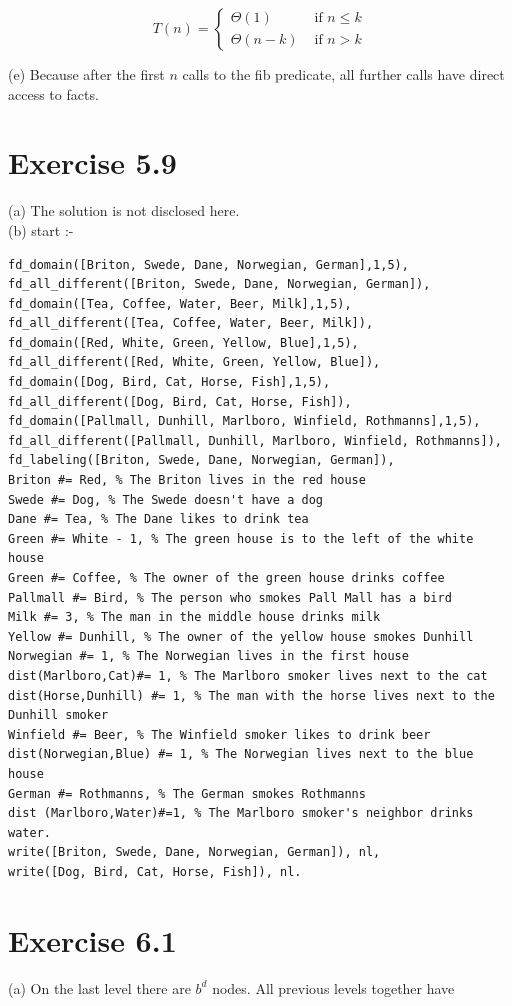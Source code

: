 \documentclass[10pt]{book}
\begin{document}
$$
T(n)= \begin{cases}\Theta(1) & \text { if } n \leq k \\ \Theta(n-k) & \text { if } n>k\end{cases}
$$

(e) Because after the first $n$ calls to the fib predicate, all further calls have direct access to facts.

\section{Exercise 5.9}
(a) The solution is not disclosed here.\\
(b) start :-

\begin{verbatim}
fd_domain([Briton, Swede, Dane, Norwegian, German],1,5),
fd_all_different([Briton, Swede, Dane, Norwegian, German]),
fd_domain([Tea, Coffee, Water, Beer, Milk],1,5),
fd_all_different([Tea, Coffee, Water, Beer, Milk]),
fd_domain([Red, White, Green, Yellow, Blue],1,5),
fd_all_different([Red, White, Green, Yellow, Blue]),
fd_domain([Dog, Bird, Cat, Horse, Fish],1,5),
fd_all_different([Dog, Bird, Cat, Horse, Fish]),
fd_domain([Pallmall, Dunhill, Marlboro, Winfield, Rothmanns],1,5),
fd_all_different([Pallmall, Dunhill, Marlboro, Winfield, Rothmanns]),
fd_labeling([Briton, Swede, Dane, Norwegian, German]),
Briton #= Red, % The Briton lives in the red house
Swede #= Dog, % The Swede doesn't have a dog
Dane #= Tea, % The Dane likes to drink tea
Green #= White - 1, % The green house is to the left of the white house
Green #= Coffee, % The owner of the green house drinks coffee
Pallmall #= Bird, % The person who smokes Pall Mall has a bird
Milk #= 3, % The man in the middle house drinks milk
Yellow #= Dunhill, % The owner of the yellow house smokes Dunhill
Norwegian #= 1, % The Norwegian lives in the first house
dist(Marlboro,Cat)#= 1, % The Marlboro smoker lives next to the cat
dist(Horse,Dunhill) #= 1, % The man with the horse lives next to the Dunhill smoker
Winfield #= Beer, % The Winfield smoker likes to drink beer
dist(Norwegian,Blue) #= 1, % The Norwegian lives next to the blue house
German #= Rothmanns, % The German smokes Rothmanns
dist (Marlboro,Water)#=1, % The Marlboro smoker's neighbor drinks water.
write([Briton, Swede, Dane, Norwegian, German]), nl,
write([Dog, Bird, Cat, Horse, Fish]), nl.
\end{verbatim}

\section{Exercise 6.1}
(a) On the last level there are $b^{d}$ nodes. All previous levels together have
\end{document}
